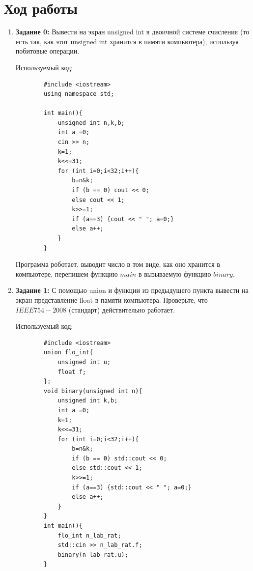 \documentclass[a4paper, 12pt]{article}
\begin{document}
    \section{Ход работы}
    \begin{enumerate}
        \item \textbf{Задание 0:} Вывести на экран unsigned int в двоичной системе счисления (то есть так, как этот unsigned int хранится в памяти компьютера), используя побитовые операции.

        Используемый код:
        \begin{lstlisting}
        #include <iostream>
        using namespace std;

        int main(){
            unsigned int n,k,b;
            int a =0;
            cin >> n;
            k=1;
            k<<=31;
            for (int i=0;i<32;i++){
                b=n&k;
                if (b == 0) cout << 0;
                else cout << 1;
                k>>=1;
                if (a==3) {cout << " "; a=0;}
                else a++;
            }
        }
        \end{lstlisting}

        Программа роботает, выводит число в том виде, как оно хранится в компьютере, перепишем функцию $main$ в вызываемую функцию $binary$.

        \item \textbf{Задание 1:} С помощью union и функции из предыдущего пункта вывести на экран представление float в памяти компьютера. Проверьте, что $IEEE 754-2008$ (стандарт) действительно работает.

        Используемый код:
        \begin{lstlisting}
        #include <iostream>
        union flo_int{
            unsigned int u;
            float f;
        };
        void binary(unsigned int n){
            unsigned int k,b;
            int a =0;
            k=1;
            k<<=31;
            for (int i=0;i<32;i++){
                b=n&k;
                if (b == 0) std::cout << 0;
                else std::cout << 1;
                k>>=1;
                if (a==3) {std::cout << " "; a=0;}
                else a++;
            }
        }
        int main(){
            flo_int n_lab_rat;
            std::cin >> n_lab_rat.f;
            binary(n_lab_rat.u);
        }
        \end{lstlisting}
        


\end{enumerate}
\end{document}
